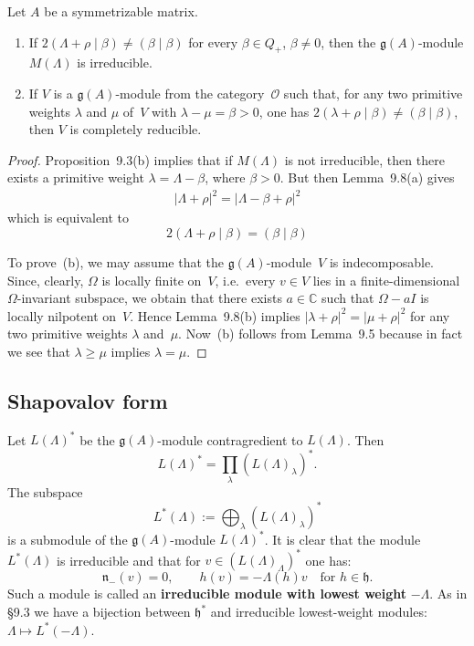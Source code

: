 \documentclass[12pt]{article}
\begin{document}
\begin{proposition}[9.9]
Let $A$ be a symmetrizable matrix.
\begin{enumerate}[label=\textup{(\alph*)}]
\item
If $2(\Lambda + \rho \mid \beta) \ne (\beta \mid \beta)$ for every $\beta \in Q_+$, $\beta \ne 0$,
then the $\mathfrak{g}(A)$-module $M(\Lambda)$ is irreducible.

\item
If $V$ is a $\mathfrak{g}(A)$-module from the category~$\mathcal{O}$ such that,
for any two primitive weights $\lambda$ and $\mu$ of~$V$ with $\lambda - \mu = \beta > 0$,
one has $2(\lambda + \rho \mid \beta) \ne (\beta \mid \beta)$,
then $V$ is completely reducible.
\end{enumerate}

\begin{proof}
Proposition~9.3(b) implies that if $M(\Lambda)$ is not irreducible,
then there exists a primitive weight $\lambda = \Lambda - \beta$, where $\beta > 0$.
But then Lemma~9.8(a) gives
\begin{align*}
|\Lambda + \rho|^2 = |\Lambda - \beta + \rho|^2
\end{align*}
which is equivalent to
\[2(\Lambda + \rho \mid \beta) = (\beta \mid \beta)\]


To prove~(b), we may assume that the $\mathfrak{g}(A)$-module~$V$ is indecomposable.
Since, clearly, $\Omega$ is locally finite on~$V$, i.e.\ every $v \in V$
lies in a finite-dimensional $\Omega$-invariant subspace, we obtain that there exists
$a \in \mathbb{C}$ such that $\Omega - aI$ is locally nilpotent on~$V$.
Hence Lemma~9.8(b) implies $|\lambda + \rho|^2 = |\mu + \rho|^2$
for any two primitive weights $\lambda$ and~$\mu$.
Now~(b) follows from Lemma~9.5 because in fact we see that $\lambda \ge \mu$ implies $\lambda = \mu$.
\end{proof}
\end{proposition}


\subsection{Shapovalov form}
Let $L(\Lambda)^*$ be the $\mathfrak{g}(A)$-module contragredient to $L(\Lambda)$. 
Then 
\[
L(\Lambda)^* = \prod_{\lambda} (L(\Lambda)_\lambda)^*.
\]
The subspace
\[
L^*(\Lambda) := \bigoplus_{\lambda} (L(\Lambda)_\lambda)^*
\]
is a submodule of the $\mathfrak{g}(A)$-module $L(\Lambda)^*$. 
It is clear that the module $L^*(\Lambda)$ is irreducible and that for 
$v \in (L(\Lambda)_\Lambda)^*$ one has:
\[
\mathfrak{n}_-(v) = 0, 
\qquad 
h(v) = -\Lambda(h)v \quad \text{for } h \in \mathfrak{h}.
\]
Such a module is called an \textbf{irreducible module with lowest weight} $-\Lambda$.
As in §9.3 we have a bijection between $\mathfrak{h}^*$ and irreducible lowest-weight
modules: $\Lambda \mapsto L^*(-\Lambda)$.
\end{document}
